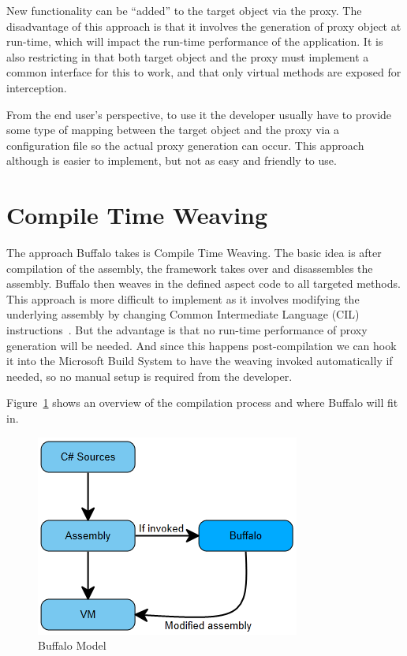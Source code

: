 New functionality can be “added” to the target object via the proxy. The disadvantage of this approach is that it involves the generation of proxy object at run-time, which will impact the run-time performance of the application. It is also restricting in that both target object and the proxy must implement a common interface for this to work, and that only virtual methods are exposed for interception.

From the end user's perspective, to use it the developer usually have to provide some type of mapping between the target object and the proxy via a configuration file so the actual proxy generation can occur. This approach although is easier to implement, but not as easy and friendly to use.

\section{Compile Time Weaving}

The approach Buffalo takes is Compile Time Weaving. The basic idea is after compilation of the assembly, the framework takes over and disassembles the assembly. Buffalo then weaves in the defined aspect code to all targeted methods. This approach is more difficult to implement as it involves modifying the underlying assembly by changing Common Intermediate Language (CIL) instructions~\cite{rewrite_msil}. But the advantage is that no run-time performance of proxy generation will be needed. And since this happens post-compilation we can hook it into the Microsoft Build System to have the weaving invoked automatically if needed, so no manual setup is required from the developer.

Figure~\ref{buffalo_model} shows an overview of the compilation process and where Buffalo will fit in.

\begin{figure}[H]
  \includegraphics[scale=1.0]{BuffaloOverview.PNG}
  \centering
  \caption{Buffalo Model\label{buffalo_model}}
\end{figure}

